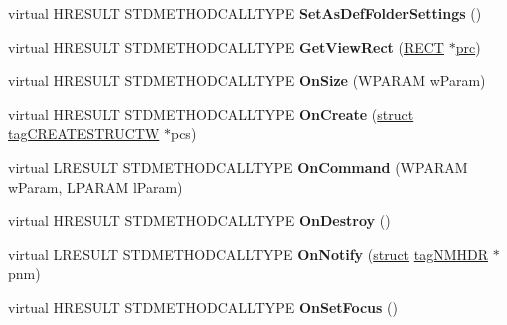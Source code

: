 \begin{DoxyCompactItemize}
\mbox{\label{class_c_common_browser_ab0e90b30aca70e628ff43734e3fe9ea7}} 
virtual H\+R\+E\+S\+U\+LT S\+T\+D\+M\+E\+T\+H\+O\+D\+C\+A\+L\+L\+T\+Y\+PE {\bfseries Set\+As\+Def\+Folder\+Settings} ()
\item 
\mbox{\label{class_c_common_browser_a14b45352ad1c0d94351e054882fe999e}} 
virtual H\+R\+E\+S\+U\+LT S\+T\+D\+M\+E\+T\+H\+O\+D\+C\+A\+L\+L\+T\+Y\+PE {\bfseries Get\+View\+Rect} (\hyperlink{structtag_r_e_c_t}{R\+E\+CT} $\ast$\hyperlink{structtag_r_e_c_t}{prc})
\item 
\mbox{\label{class_c_common_browser_a0082da9308625cd74ae5ff68fa300b66}} 
virtual H\+R\+E\+S\+U\+LT S\+T\+D\+M\+E\+T\+H\+O\+D\+C\+A\+L\+L\+T\+Y\+PE {\bfseries On\+Size} (W\+P\+A\+R\+AM w\+Param)
\item 
\mbox{\label{class_c_common_browser_a3ac48505d25c118921719e4355eed693}} 
virtual H\+R\+E\+S\+U\+LT S\+T\+D\+M\+E\+T\+H\+O\+D\+C\+A\+L\+L\+T\+Y\+PE {\bfseries On\+Create} (\hyperlink{interfacestruct}{struct} \hyperlink{structtag_c_r_e_a_t_e_s_t_r_u_c_t_w}{tag\+C\+R\+E\+A\+T\+E\+S\+T\+R\+U\+C\+TW} $\ast$pcs)
\item 
\mbox{\label{class_c_common_browser_a339b4ad3b6b9e0b9b54801118138fe80}} 
virtual L\+R\+E\+S\+U\+LT S\+T\+D\+M\+E\+T\+H\+O\+D\+C\+A\+L\+L\+T\+Y\+PE {\bfseries On\+Command} (W\+P\+A\+R\+AM w\+Param, L\+P\+A\+R\+AM l\+Param)
\item 
\mbox{\label{class_c_common_browser_ab7f01d107fbbf5406e5a18adb1762d80}} 
virtual H\+R\+E\+S\+U\+LT S\+T\+D\+M\+E\+T\+H\+O\+D\+C\+A\+L\+L\+T\+Y\+PE {\bfseries On\+Destroy} ()
\item 
\mbox{\label{class_c_common_browser_ab2257837c1e6fa1f5cc712c6febdcbf3}} 
virtual L\+R\+E\+S\+U\+LT S\+T\+D\+M\+E\+T\+H\+O\+D\+C\+A\+L\+L\+T\+Y\+PE {\bfseries On\+Notify} (\hyperlink{interfacestruct}{struct} \hyperlink{structtag_n_m_h_d_r}{tag\+N\+M\+H\+DR} $\ast$pnm)
\item 
\mbox{\label{class_c_common_browser_af1b69d5f2a0516f37934d57e28611457}} 
virtual H\+R\+E\+S\+U\+LT S\+T\+D\+M\+E\+T\+H\+O\+D\+C\+A\+L\+L\+T\+Y\+PE {\bfseries On\+Set\+Focus} ()

\end{DoxyCompactItemize}

